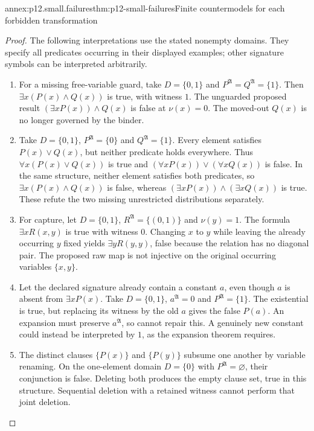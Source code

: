 \begin{annexitem}{annex:p12.small.failures}{thm:p12-small-failures}{Finite countermodels for each forbidden transformation}
\begin{proof}
The following interpretations use the stated nonempty domains.
They specify all predicates occurring in their displayed examples;
other signature symbols can be interpreted arbitrarily.
\begin{enumerate}
\item For a missing free-variable guard, take \(D=\{0,1\}\)
and \(P^{\mathfrak A}=Q^{\mathfrak A}=\{1\}\).
Then \(\exists x(P(x)\land Q(x))\) is true, with witness \(1\).
The unguarded proposed result
\((\exists xP(x))\land Q(x)\) is false at \(\nu(x)=0\).
The moved-out \(Q(x)\) is no longer governed by the binder.

\item Take \(D=\{0,1\}\), \(P^{\mathfrak A}=\{0\}\)
and \(Q^{\mathfrak A}=\{1\}\). Every element satisfies
\(P(x)\lor Q(x)\), but neither predicate holds everywhere.
Thus \(\forall x(P(x)\lor Q(x))\) is true and
\((\forall xP(x))\lor(\forall xQ(x))\) is false.
In the same structure, neither element satisfies both predicates,
so \(\exists x(P(x)\land Q(x))\) is false, whereas
\((\exists xP(x))\land(\exists xQ(x))\) is true.
These refute the two missing unrestricted distributions separately.

\item For capture, let \(D=\{0,1\}\),
\(R^{\mathfrak A}=\{(0,1)\}\) and \(\nu(y)=1\).
The formula \(\exists xR(x,y)\) is true with witness \(0\).
Changing \(x\) to \(y\) while leaving the already occurring
\(y\) fixed yields \(\exists yR(y,y)\), false because the
relation has no diagonal pair. The proposed raw map is not
injective on the original occurring variables \(\{x,y\}\).

\item Let the declared signature already contain a constant \(a\),
even though \(a\) is absent from \(\exists xP(x)\). Take
\(D=\{0,1\}\), \(a^{\mathfrak A}=0\) and
\(P^{\mathfrak A}=\{1\}\). The existential is true, but
replacing its witness by the old \(a\) gives the false \(P(a)\).
An expansion must preserve \(a^{\mathfrak A}\), so cannot repair
this. A genuinely new constant could instead be interpreted by
\(1\), as the expansion theorem requires.

\item The distinct clauses \(\{P(x)\}\) and \(\{P(y)\}\)
subsume one another by variable renaming. On the one-element
domain \(D=\{0\}\) with \(P^{\mathfrak A}=\varnothing\),
their conjunction is false. Deleting both produces the empty
clause set, true in this structure. Sequential deletion with a
retained witness cannot perform that joint deletion.


\end{enumerate}
\end{proof}
\end{annexitem}
